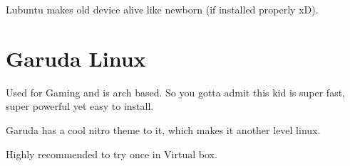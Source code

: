\documentclass[10pt, a4paper]{memoir}
\begin{document}
Lubuntu  makes old device alive like newborn (if installed properly xD).


\section{ Garuda Linux}
Used for Gaming and is arch based. So you gotta admit this kid is super fast, super powerful yet easy to install. 

Garuda has a cool nitro theme to it, which makes it another level linux. 

Highly recommended to try once in Virtual box.
\end{document}
